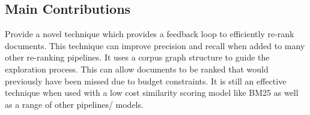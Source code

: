 \documentclass[sigconf,authorversion,nonacm]{acmart}
\begin{document}
\subsection{Main Contributions}

Provide a novel technique which provides a feedback loop to efficiently re-rank documents. This
technique can improve precision and recall when added to many other re-ranking pipelines. It uses a
corpus graph structure to guide the exploration process. This can allow documents to be ranked that
would previously have been missed due to budget constraints. It is still an effective technique when
used with a low cost similarity scoring model like BM25 as well as a range of other pipelines/
models.





\end{document}
